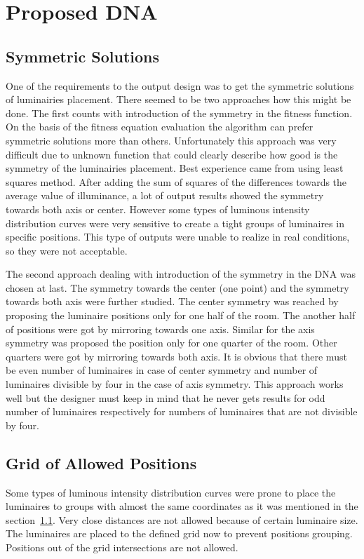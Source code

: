 \section{Proposed DNA}
\subsection{Symmetric Solutions}
\label{ssec:symmetry}
One of the requirements to the output design was to get the symmetric solutions of luminairies placement. There seemed to be two approaches how this might be done. The first counts with introduction of the symmetry in the fitness function. On the basis of the fitness equation evaluation the algorithm can prefer symmetric solutions more than others. Unfortunately this approach was very difficult due to unknown function that could clearly describe how good is the symmetry of the luminairies placement. Best experience came from using least squares method. After adding the sum of squares of the differences towards the average value of illuminance, a lot of output results showed the symmetry towards both axis or center. However some types of luminous intensity distribution curves were very sensitive to create a tight groups of luminaires in specific positions. This type of outputs were unable to realize in real conditions, so they were not acceptable.

The second approach dealing with introduction of the symmetry in the DNA was chosen at last. The symmetry towards the center (one point) and the symmetry towards both axis were further studied. The center symmetry was reached by proposing the luminaire positions only for one half of the room. The another half of positions were got by mirroring towards one axis. Similar for the axis symmetry was proposed the position only for one quarter of the room. Other quarters were got by mirroring towards both axis. It is obvious that there must be even number of luminaires in case of center symmetry and number of luminaires divisible by four in the case of axis symmetry. This approach works well but the designer must keep in mind that he never gets results for odd number of luminaires respectively for numbers of luminaires that are not divisible by four.

\subsection{Grid of Allowed Positions}
\label{ssec:grid}
Some types of luminous intensity distribution curves were prone to place the luminaires to groups with almost the same coordinates as it was mentioned in the section~\ref{ssec:symmetry}. Very close distances are not allowed because of certain luminaire size. The luminaires are placed to the defined grid now to prevent positions grouping. Positions out of the grid intersections are not allowed.

